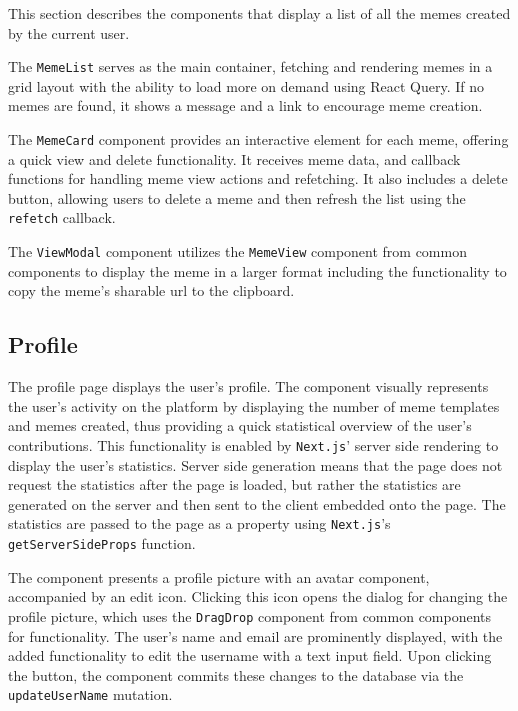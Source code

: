 This section describes the components that display a list of all the memes created by the current user.  

The \texttt{MemeList} serves as the main container, fetching and rendering memes in a grid layout with the ability to load more on demand using React Query.\cite{react-query-infinite}  If no memes are found, it shows a message and a link to encourage meme creation.

The \texttt{MemeCard} component provides an interactive element for each meme, offering a quick view and delete functionality. It receives meme data, and callback functions for handling meme view actions and refetching. It also includes a delete button, allowing users to delete a meme and then refresh the list using the \texttt{refetch} callback.

The \texttt{ViewModal} component utilizes the \texttt{MemeView} component from common components to display the meme in a larger format including the functionality to copy the meme's sharable \acrshort{url} to the clipboard.

\subsection{Profile}

The profile page displays the user's profile. The component visually represents the user's activity on the platform by displaying the number of meme templates and memes created, thus providing a quick statistical overview of the user's contributions. This functionality is enabled by \texttt{Next.js}' server side rendering to display the user's statistics. Server side generation means that the page does not request the statistics after the page is loaded, but rather the statistics are generated on the server and then sent to the client embedded onto the page.\cite{next-ssg} The statistics are passed to the page as a property using \texttt{Next.js}'s \texttt{getServerSideProps} function.

The component presents a profile picture with an avatar component, accompanied by an edit icon. Clicking this icon opens the dialog for changing the profile picture, which uses the \texttt{DragDrop} component from common components for functionality. The user's name and email are prominently displayed, with the added functionality to edit the username with a text input field. Upon clicking the button, the component commits these changes to the database via the \texttt{updateUserName} mutation.

